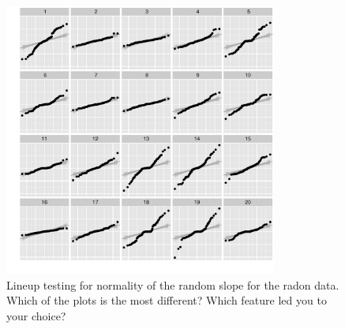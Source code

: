 \documentclass[12pt]{article}
\begin{document}
\begin{figure}[hbt]
	\centering
	\includegraphics[width=0.8\textwidth]{radonqqb2-3-10.pdf}
	\caption{\label{fig:qqlineup-1}
	Lineup testing  for normality of the random slope for the radon data. Which of the plots is the most different? Which feature led you to your choice? }
\end{figure}
\end{document}
